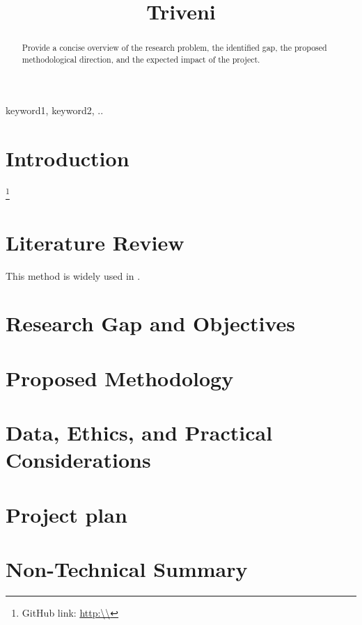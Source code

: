 \documentclass[conference]{IEEEtran}
\begin{document}
\title{Triveni}

\author{
}

\maketitle

\begin{abstract}
Provide a concise overview of the research problem, the identified gap, the proposed methodological direction, and the expected impact of the project.
\end{abstract}

\begin{IEEEkeywords}
keyword1, keyword2, ..
\end{IEEEkeywords}

\section{Introduction}

\footnote {GitHub link: \url{http:\\}}


\section{Literature Review}
This method is widely used in  \cite{key2024example}.
\section{Research Gap and Objectives }
\section{Proposed Methodology}
\section{Data, Ethics, and Practical Considerations}
\section{Project plan}
\section{Non-Technical Summary}



\end{document}
